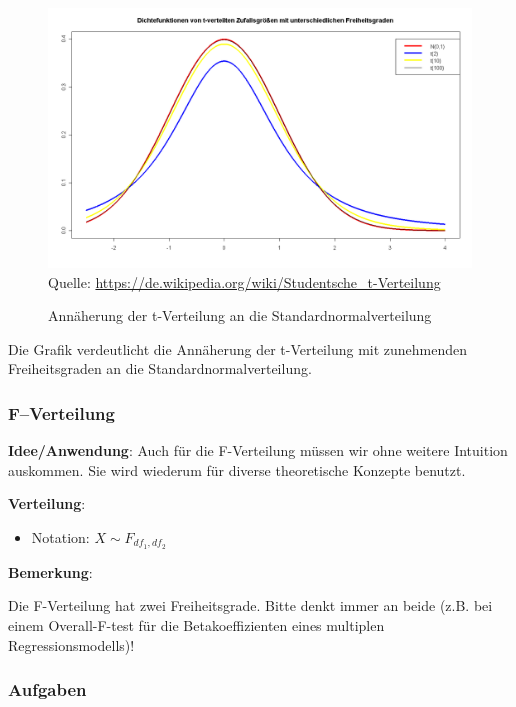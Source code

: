 \documentclass[a4paper]{article}
\newcommand\dangersign[1][2ex]{%
  \renewcommand\stacktype{L}%
  \scaleto{\stackon[1.3pt]{\color{red}$\triangle$}{\tiny !}}{#1}%
}
\begin{document}
\begin{figure}[H] 
\caption{Annäherung der t-Verteilung an die Standardnormalverteilung}\label{Fig:a}
\centering
\includegraphics[scale=0.35]{figures/T-distribution.png}
\footnotesize{Quelle: \url{https://de.wikipedia.org/wiki/Studentsche_t-Verteilung}}
\end{figure}

\noindent Die Grafik verdeutlicht die Annäherung der t-Verteilung mit zunehmenden Freiheitsgraden an die Standardnormalverteilung.

\subsubsection{F--Verteilung}\label{sec:fdistr}

\textbf{Idee/Anwendung}: Auch für die F-Verteilung müssen wir ohne weitere Intuition auskommen. Sie wird wiederum für diverse theoretische Konzepte benutzt. 

\noindent \textbf{Verteilung}:
\begin{itemize}
\item[] Notation: $X \sim F_{df_1,df_2}$

\end{itemize}

\noindent \textbf{Bemerkung}: 

\noindent \dangersign[3ex] Die F-Verteilung hat zwei Freiheitsgrade. Bitte denkt immer an beide (z.B. bei einem Overall-F-test für die Betakoeffizienten eines multiplen Regressionsmodells)!


\clearpage
\subsubsection{Aufgaben}
\end{document}
